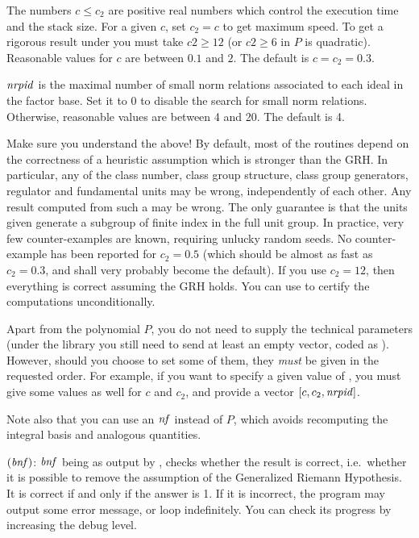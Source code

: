 The numbers $c \leq c_2$ are positive real numbers which control the
execution time and the stack size. For a given $c$, set
$c_2 = c$ to get maximum speed. To get a rigorous result under  you
must take $c2\geq 12$ (or $c2\geq 6$ in $P$ is quadratic). Reasonable values
for $c$ are between $0.1$ and $2$. The default is $c = c_2 = 0.3$.

$\hbox{\it nrpid\/}$ is the maximal number of small norm relations associated to each
ideal in the factor base. Set it to $0$ to disable the search for small norm
relations. Otherwise, reasonable values are between 4 and 20. The default is
4.

 Make sure you understand the above! By default, most of
the  routines depend on the correctness of a heuristic assumption
which is stronger than the GRH. In particular, any of the class number, class
group structure, class group generators, regulator and fundamental units may
be wrong, independently of each other. Any result computed from such a
 may be wrong. The only guarantee is that the units given generate a
subgroup of finite index in the full unit group. In practice, very few
counter-examples are known, requiring unlucky random seeds. No
counter-example has been reported for $c_2 = 0.5$ (which should be almost as
fast as $c_2 = 0.3$, and shall very probably become the default). If you use
$c_2 = 12$, then everything is correct assuming the GRH holds. You can
use  to certify the computations unconditionally.


Apart from the polynomial $P$, you do not need to supply the technical
parameters (under the library you still need to send at least an empty
vector, coded as ). However, should you choose to set some of them,
they \emph{must} be given in the requested order. For example, if you want to
specify a given value of 
, you must give some values as well for $c$
and $c_2$, and provide a vector $[c,c_2,\hbox{\it nrpid\/}]$.

Note also that you can use an $\hbox{\it nf\/}$ instead of $P$, which avoids
recomputing the integral basis and analogous quantities.

\smallskip
{}$(\hbox{\it bnf\/})$: $\hbox{\it bnf\/}$ being as output by
, checks whether the result is correct, i.e.~whether it is
possible to remove the assumption of the Generalized Riemann
Hypothesis. It is correct if and only if the answer is 1. If it is
incorrect, the program may output some error message, or loop indefinitely.
You can check its progress by increasing the debug level.

